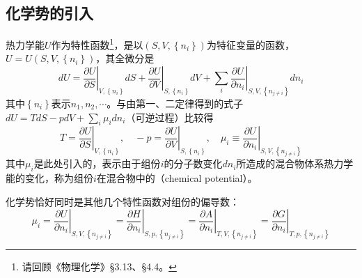 \documentclass[main.tex]{subfiles}
\begin{document}
\subsection{化学势的引入}
热力学能$U$作为特性函数\footnote{请回顾《物理化学》\S 3.13、\S 4.4。}，是以$\left(S, V,\left\{n_i\right\}\right)$为特征变量的函数，$U=U\left(S,V,\left\{n_i\right\}\right)$，其全微分是
\[dU=\left.\frac{\partial U}{\partial S}\right|_{V,\left\{n_i\right\}}dS+\left.\frac{\partial U}{\partial V}\right|_{S,\left\{n_i\right\}}dV+\sum_i\left.\frac{\partial U}{\partial n_i}\right|_{S,V,\left\{n_{j\neq i}\right\}}dn_i\]
其中$\left\{n_i\right\}$表示$n_1,n_2,\cdots$。与由第一、二定律得到的式子$dU=TdS-pdV+\sum_i\mu_idn_i$（可逆过程）比较得
\[T=\left.\frac{\partial U}{\partial S}\right|_{V,\left\{n_i\right\}},\quad-p=\left.\frac{\partial U}{\partial V}\right|_{S,\left\{n_i\right\}},\quad\mu_i\equiv\left.\frac{\partial U}{\partial n_i}\right|_{S,V,\left\{n_{j\neq i}\right\}}\]
其中$\mu_i$是此处引入的，表示由于组份$i$的分子数变化$dn_i$所造成的混合物体系热力学能的变化，称为组份$i$在混合物中的（chemical potential）。

化学势恰好同时是其他几个特性函数对组份的偏导数：
\[\mu_i=\left.\frac{\partial U}{\partial n_i}\right|_{S,V,\left\{n_{j\neq i}\right\}}=\left.\frac{\partial H}{\partial n_i}\right|_{S,p,\left\{n_{j\neq i}\right\}}=\left.\frac{\partial A}{\partial n_i}\right|_{T,V,\left\{n_{j\neq i}\right\}}=\left.\frac{\partial G}{\partial n_i}\right|_{T,p,\left\{n_{j\neq i}\right\}}\]
\end{document}
